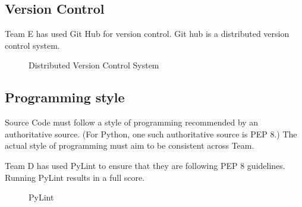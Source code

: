   \subsection{Version Control}
  \begin{flushleft}
    Team E has used Git Hub for version control. Git hub is a distributed version control system.
    \begin{figure}[h!]
        \centering
        \caption{Distributed Version Control System}
        \label{fig:GitHub repo}
      \end{figure}
  \end{flushleft}

  \subsection{Programming style}
\begin{flushleft}
    Source Code must follow a style of programming recommended by an authoritative source. (For 
Python, one such authoritative source is PEP 8.) The actual style of programming must 
aim to be consistent across Team.
\end{flushleft}
\begin{flushleft}
    Team D has used PyLint to ensure that they are following PEP 8 guidelines. Running PyLint results in a full score.
    \begin{figure}[h!]
        \centering
        \caption{PyLint}
        \label{fig:PyLint}
      \end{figure}
\end{flushleft}
